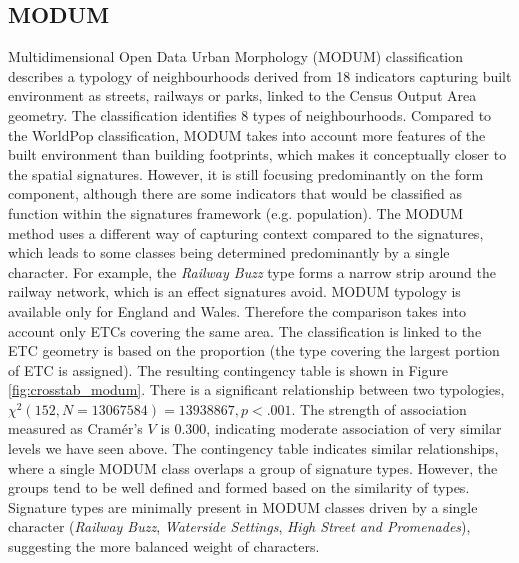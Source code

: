 \documentclass[fleqn,10pt]{wlscirep}
\begin{document}
\subsection*{MODUM}
Multidimensional Open Data Urban Morphology (MODUM) classification describes a typology
of neighbourhoods derived from 18 indicators capturing built environment as streets,
railways or parks, linked to the Census Output Area geometry. The classification
identifies 8 types of neighbourhoods.
Compared to the WorldPop classification, MODUM takes into account more features of
the built environment than building footprints, which makes it conceptually closer to the
spatial signatures. However, it is still focusing predominantly on the form component,
although there are some indicators that would be classified as function within the
signatures framework (e.g. population). The MODUM method uses a different way of
capturing context compared to the signatures, which leads to some classes being
determined predominantly by a single character. For example, the \textit{Railway Buzz} type
forms a narrow strip around the railway network, which is an effect signatures avoid.
MODUM typology is available only for England and Wales. Therefore the comparison takes
into account only ETCs covering the same area. The classification is linked to the
ETC geometry is based on the proportion (the type covering the largest portion of ETC is
assigned). The resulting contingency table is shown in Figure \ref{fig:crosstab_modum}. There is a
significant relationship between two typologies, $\chi^{2} (152, N = 13067584) =
13938867, p < .001$. The strength of association measured as Cramér's $V$ is $0.300$,
indicating moderate association of very similar levels we have seen above. The
contingency table indicates similar relationships, where a single MODUM class overlaps a
group of signature types. However, the groups tend to be well defined and formed based
on the similarity of types. Signature types are minimally present in MODUM classes driven
by a single character (\textit{Railway Buzz}, \textit{Waterside Settings},
\textit{High Street and Promenades}), suggesting the more balanced weight of characters.
\end{document}
